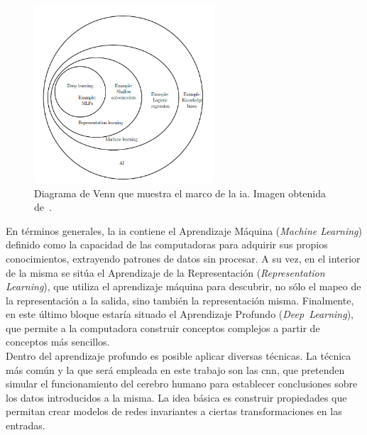 \begin{figure}[H]
	\begin{center}
		\includegraphics[width=0.6\textwidth]{figures/aprendizaje}
		\caption{Diagrama de Venn que muestra el marco de la \acrshort{ia}. Imagen obtenida de~\cite{Goodfellow-et-al-2016}.}
		\label{fig.aprendizaje}
	\end{center}
\end{figure}

En términos generales, la \acrshort{ia} contiene el Aprendizaje Máquina (\textit{Machine Learning}) definido como la capacidad de las computadoras para adquirir sus propios conocimientos, extrayendo patrones de datos sin procesar. A su vez, en el interior de la misma se sitúa el Aprendizaje de la Representación (\textit{Representation Learning}), que utiliza el aprendizaje máquina para descubrir, no sólo el mapeo de la representación a la salida, sino también la representación misma. Finalmente, en este último bloque estaría situado el Aprendizaje Profundo (\textit{Deep~Learning}), que permite a la computadora construir conceptos complejos a partir de conceptos más sencillos.\\

Dentro del aprendizaje profundo es posible aplicar diversas técnicas. La técnica más común y la que será empleada en este trabajo son las \acrfull{cnn}, que pretenden simular el funcionamiento del cerebro humano para establecer conclusiones sobre los datos introducidos a la misma. La idea básica es construir propiedades que permitan crear modelos de redes invariantes a ciertas transformaciones en las entradas.\\

